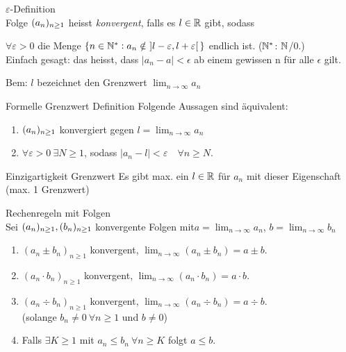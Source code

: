 

\begin{definition}{$\varepsilon$-Definition}
    \\Folge $\sequence$ heisst \emph{konvergent}, falls es $l \in \R$ gibt, sodass \vspace{1mm}
    
    $\forall \varepsilon > 0$ die Menge $\{n \in \N^* : a_n \notin~] l - \varepsilon, l + \varepsilon[\,\}$ endlich ist. ($\N^*$: $\N$/$0$.) \vspace{1mm} \\ 
    Einfach gesagt: das heisst, dass $|a_n - a| < \epsilon$ ab einem gewissen n für alle $\epsilon$ gilt.
   
\end{definition}
Bem: $l$ bezeichnet den Grenzwert $\lim_{n \to \infty} a_n$
\begin{definition}{Formelle Grenzwert Definition}
    Folgende Aussagen sind äquivalent:
    \begin{enumerate}
        \item $\sequence$ konvergiert gegen $l = \lim_{n \to \infty} a_n$
        \item $\forall \varepsilon > 0~\exists N \geq 1$, sodass $|a_n -l | < \varepsilon \quad \forall n \geq N$.
    \end{enumerate}
\end{definition}
\begin{lemma}{Einzigartigkeit Grenzwert}
     Es gibt max. ein $l \in \R$ für $a_n$ mit dieser Eigenschaft (max. 1 Grenzwert)
\end{lemma}
\begin{theorem}{Rechenregeln mit Folgen}
    \\Sei $\sequence,\sequence[b]$ konvergente Folgen mit$a = \lim_{n \to \infty} a_n$, $b = \lim_{n \to \infty} b_n$
    \begin{enumerate}
        \item $(a_n \pm b_n)_{n \geq 1}$ konvergent, $\lim_{n \to \infty} (a_n \pm b_n) = a \pm b$.
        \item $(a_n \cdot b_n)_{n \geq 1}$ konvergent, $\lim_{n \to \infty} (a_n \cdot b_n) = a \cdot b$.
        \item $(a_n \div  b_n)_{n \geq 1}$ konvergent, $\lim_{n \to \infty} (a_n \div b_n) = a \div b$.
        \\(solange $b_n \neq 0 ~ \forall n \geq 1$ und $b \neq 0$)
        \item Falls $\exists K \geq 1$ mit $a_n \leq b_n ~ \forall n \geq K$ folgt $a \leq b$.
    \end{enumerate}
\end{theorem}





